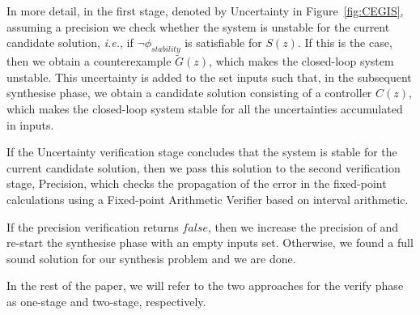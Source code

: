 \documentclass{sig-alternate-05-2015}
\newcommand{\red}[1]{{\color{red}#1}}
\begin{document}
In more detail, in the first stage, denoted by {\sc Uncertainty} in Figure~\ref{fig:CEGIS}, 
assuming a precision  
we check whether the system is unstable for the current candidate solution,
{\it i.e.}, if $\neg \phi_\mathit{stability}$ is satisfiable for $S(z)$.
If this is the case, then we obtain a counterexample 
$\tilde G(z)$, 
which makes the closed-loop system unstable. 
This uncertainty is added to 
the set {\sc inputs} such that, in the subsequent {\sc synthesise} phase, 
we obtain a candidate solution consisting 
of a controller $C(z)$, which makes the closed-loop 
system stable for all the uncertainties accumulated in {\sc inputs}.

If the {\sc Uncertainty} verification stage concludes that
the system is stable for the current candidate solution,
then we pass this solution to the second verification stage, {\sc Precision}, 
which checks the propagation of the error in the fixed-point 
calculations using a Fixed-point Arithmetic Verifier based on 
interval arithmetic. 
%
%

If the {\sc precision} verification returns $\mathit{false}$, then we
increase the precision of  and re-start the {\sc
  synthesise} phase with an empty {\sc inputs} set.  Otherwise, we
found a full sound solution for our synthesis problem and we are done.

In the rest of the paper, we will refer to the two approaches 
for the {\sc verify} phase as one-stage and two-stage, respectively.

\end{document}
